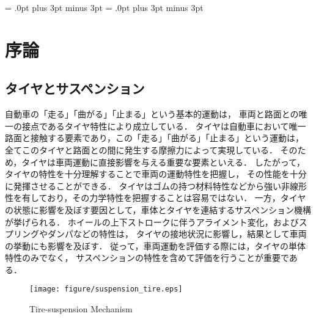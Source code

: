 \documentclass[a4paper,12pt]{article_vdlab_sotsuron}
\begin{document}
\kanjiskip = .0pt plus 3pt minus 3pt
\xkanjiskip = .0pt plus 3pt minus 3pt
\small
{}


\begin{center}
\end{center}

\tableofcontents


\newpage
\section{序論}
\subsection{タイヤとサスペンション}
自動車の「走る」「曲がる」「止まる」という基本的運動は，
車両と路面との唯一の接点であるタイヤ特性により成立している．
タイヤは自動車において唯一路面と接触する要素であり，この「走る」「曲がる」「止まる」という運動は，
全てこのタイヤと路面との間に発生する摩擦力によって実現している\cite{uno}．
そのため，タイヤは車両運動に直接影響を与える重要な要素といえる．
したがって，タイヤの特性を十分理解することで車両の運動特性を把握し，
その性能を十分に発揮させることができる\cite{nasu}．
タイヤはゴムの持つ材料特性などから強い非線形性を有しており，その力学特性を把握することは容易ではない．
一方，タイヤの状態に影響を及ぼす要因として，車体とタイヤを連結するサスペンション機構が挙げられる．
ホイールの上下ストロークに伴うアライメント変化，およびスプリングやダンパなどの特性は，
タイヤの接地状況に影響し，結果として車両の挙動にも影響を及ぼす．
従って，車両運動を評価する際には，タイヤの単体特性のみでなく，
サスペンションの特性を含めて評価を行うことが重要である\cite{shiiba}．

\vspace{20mm}
\begin{figure}[h]
  \centering
  \texttt{[image: figure/suspension\_tire.eps]}
  \vspace{4mm}
   \caption{Tire-suspension Mechanism\cite{bmw}}
  \label{fig:tiresus}
\end{figure}
\end{document}
